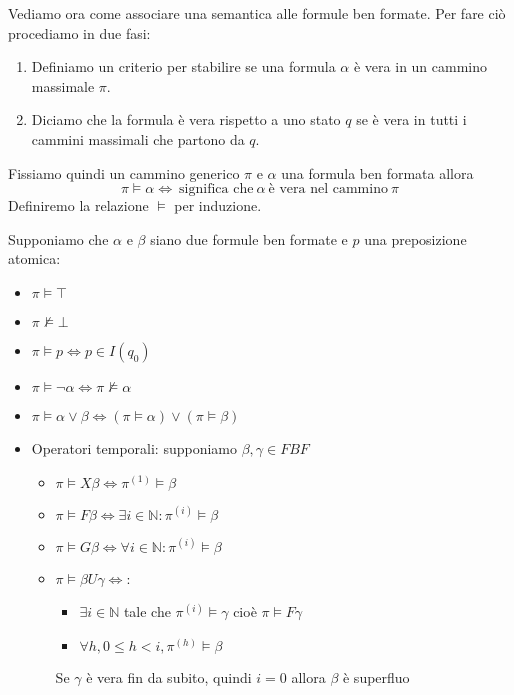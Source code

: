 Vediamo ora come associare una semantica alle formule ben formate. Per fare ciò
procediamo in due fasi:
\begin{enumerate}
    \item Definiamo un criterio per stabilire se una formula $\alpha$ è vera in
          un cammino massimale $\pi$.
    \item Diciamo che la formula è vera rispetto a uno stato $q$ se è vera in
          tutti i cammini massimali che partono da $q$.
\end{enumerate}
Fissiamo quindi un cammino generico $\pi$ e $\alpha$ una formula ben formata allora
\begin{equation}
    \pi \vDash \alpha \iff \ \text{significa che} \ \alpha \ \text{è vera nel cammino}
    \ \pi
\end{equation}
Definiremo la relazione $\vDash$ per induzione.
\begin{definizione}
    Supponiamo che $\alpha$ e $\beta$
    siano due formule ben formate e $p$ una preposizione atomica:
    \begin{itemize}
        \item $\pi \vDash \top$
        \item $\pi \not\vDash \bot$
        \item $\pi \vDash p \iff p\in I(q_0)$
        \item $\pi \vDash \lnot \alpha \iff \pi \not\vDash \alpha$
        \item $\pi \vDash  \alpha \lor \beta \iff (\pi \vDash \alpha)\lor (\pi \vDash
                  \beta) $
        \item Operatori temporali: supponiamo $\beta, \gamma \in FBF$
              \begin{itemize}
                  \item $\pi\vDash X\beta \iff \pi^{(1)}\vDash \beta$
                  \item $\pi\vDash F\beta \iff \exists i \in \mathbb{N}:\pi^{(i)}
                            \vDash \beta$
                  \item $\pi\vDash G\beta \iff \forall i \in \mathbb{N}:\pi^{(i)}
                            \vDash \beta$
                  \item $\pi \vDash \beta U  \gamma \iff$:
                        \begin{itemize}
                            \item $\exists i \in \mathbb{N}$ tale che $\pi^{(i)}\vDash
                                      \gamma$ cioè $\pi\vDash F\gamma$
                            \item $\forall h, 0\le h < i, \pi^{(h)}\vDash \beta$
                        \end{itemize}
                        Se $\gamma$ è vera fin da subito, quindi $i=0$ allora $\beta$
                        è superfluo
              \end{itemize}
    \end{itemize}
\end{definizione}
